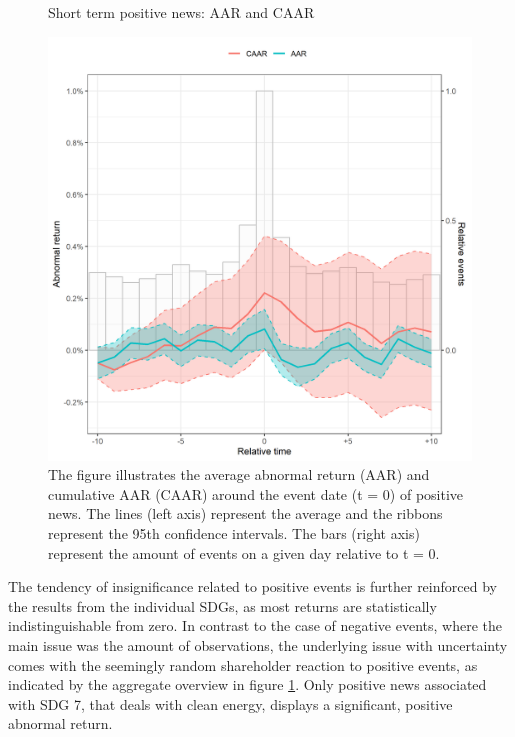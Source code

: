 \begin{figure} [H] 
    \centering
    \caption{Short term positive news: AAR and CAAR}
    \includegraphics[scale=0.6]{Projekt/1.Figures analysis/ST_positive_all_CI.png}
    \caption*{\footnotesize The figure illustrates the average abnormal return (AAR) and cumulative AAR (CAAR) around the event date (t = 0) of positive news. The lines (left axis) represent the average and the ribbons represent the 95th confidence intervals. The bars (right axis) represent the amount of events on a given day relative to t = 0. }
    \label{fig:ST_pos_news}
\end{figure}


The tendency of insignificance related to positive events is further reinforced by the results from the individual SDGs, as most returns are statistically indistinguishable from zero. In contrast to the case of negative events, where the main issue was the amount of observations, the underlying issue with uncertainty comes with the seemingly random shareholder reaction to positive events, as indicated by the aggregate overview in figure \ref{fig:ST_pos_news}. Only positive news associated with SDG 7, that deals with clean energy, displays a significant, positive abnormal return. 
 
